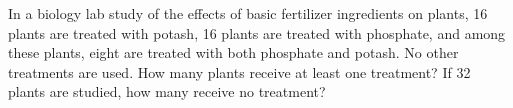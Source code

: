 \documentclass{book}
\begin{document}
\setcounter{cpjt}{216}
\addtocounter{cpjt}{-1}
\begin{activity}\label{fertilizer2}
\hypertarget{p-1166}{}%
In a biology lab study of the effects of basic fertilizer ingredients on plants, 16 plants are treated with potash, 16 plants are treated with phosphate, and among these plants, eight are treated with both phosphate and potash. No other treatments are used. How many plants receive at least one treatment? If 32 plants are studied, how many receive no treatment?%
\par\smallskip%
\noindent\end{activity}

\clearpage
\end{document}
